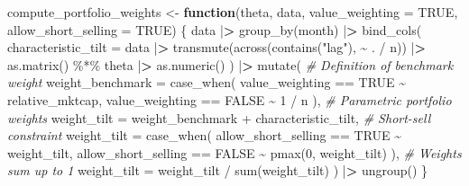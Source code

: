 \documentclass[
]{book}
\newenvironment{Shaded}{\begin{snugshade}}{\end{snugshade}}
\newcommand{\AttributeTok}[1]{\textcolor[rgb]{0.61,0.61,0.61}{#1}}
\newcommand{\CommentTok}[1]{\textcolor[rgb]{0.37,0.37,0.37}{\textit{#1}}}
\newcommand{\ConstantTok}[1]{\textcolor[rgb]{0,0,0}{#1}}
\newcommand{\ControlFlowTok}[1]{\textcolor[rgb]{0.27,0.27,0.27}{\textbf{#1}}}
\newcommand{\DecValTok}[1]{\textcolor[rgb]{0.06,0.06,0.06}{#1}}
\newcommand{\ErrorTok}[1]{\textcolor[rgb]{0.14,0.14,0.14}{\textbf{#1}}}
\newcommand{\FunctionTok}[1]{\textcolor[rgb]{0,0,0}{#1}}
\newcommand{\NormalTok}[1]{#1}
\newcommand{\OtherTok}[1]{\textcolor[rgb]{0.37,0.37,0.37}{#1}}
\newcommand{\SpecialCharTok}[1]{\textcolor[rgb]{0,0,0}{#1}}
\newcommand{\StringTok}[1]{\textcolor[rgb]{0.5,0.5,0.5}{#1}}
\begin{document}
\begin{Shaded}
\begin{Highlighting}[]
\NormalTok{compute\_portfolio\_weights }\OtherTok{\textless{}{-}} \ControlFlowTok{function}\NormalTok{(theta,}
\NormalTok{                                      data,}
                                      \AttributeTok{value\_weighting =} \ConstantTok{TRUE}\NormalTok{,}
                                      \AttributeTok{allow\_short\_selling =} \ConstantTok{TRUE}\NormalTok{) \{}
\NormalTok{  data }\SpecialCharTok{|}\ErrorTok{\textgreater{}}
    \FunctionTok{group\_by}\NormalTok{(month) }\SpecialCharTok{|}\ErrorTok{\textgreater{}}
    \FunctionTok{bind\_cols}\NormalTok{(}
      \AttributeTok{characteristic\_tilt =}\NormalTok{ data }\SpecialCharTok{|}\ErrorTok{\textgreater{}}
        \FunctionTok{transmute}\NormalTok{(}\FunctionTok{across}\NormalTok{(}\FunctionTok{contains}\NormalTok{(}\StringTok{"lag"}\NormalTok{), }\SpecialCharTok{\textasciitilde{}}\NormalTok{ . }\SpecialCharTok{/}\NormalTok{ n)) }\SpecialCharTok{|}\ErrorTok{\textgreater{}}
        \FunctionTok{as.matrix}\NormalTok{() }\SpecialCharTok{\%*\%}\NormalTok{ theta }\SpecialCharTok{|}\ErrorTok{\textgreater{}} \FunctionTok{as.numeric}\NormalTok{()}
\NormalTok{    ) }\SpecialCharTok{|}\ErrorTok{\textgreater{}}
    \FunctionTok{mutate}\NormalTok{(}
      \CommentTok{\# Definition of benchmark weight}
      \AttributeTok{weight\_benchmark =} \FunctionTok{case\_when}\NormalTok{(}
\NormalTok{        value\_weighting }\SpecialCharTok{==} \ConstantTok{TRUE} \SpecialCharTok{\textasciitilde{}}\NormalTok{ relative\_mktcap,}
\NormalTok{        value\_weighting }\SpecialCharTok{==} \ConstantTok{FALSE} \SpecialCharTok{\textasciitilde{}} \DecValTok{1} \SpecialCharTok{/}\NormalTok{ n}
\NormalTok{      ),}
      \CommentTok{\# Parametric portfolio weights}
      \AttributeTok{weight\_tilt =}\NormalTok{ weight\_benchmark }\SpecialCharTok{+}\NormalTok{ characteristic\_tilt,}
      \CommentTok{\# Short{-}sell constraint}
      \AttributeTok{weight\_tilt =} \FunctionTok{case\_when}\NormalTok{(}
\NormalTok{        allow\_short\_selling }\SpecialCharTok{==} \ConstantTok{TRUE} \SpecialCharTok{\textasciitilde{}}\NormalTok{ weight\_tilt,}
\NormalTok{        allow\_short\_selling }\SpecialCharTok{==} \ConstantTok{FALSE} \SpecialCharTok{\textasciitilde{}} \FunctionTok{pmax}\NormalTok{(}\DecValTok{0}\NormalTok{, weight\_tilt)}
\NormalTok{      ),}
      \CommentTok{\# Weights sum up to 1}
      \AttributeTok{weight\_tilt =}\NormalTok{ weight\_tilt }\SpecialCharTok{/} \FunctionTok{sum}\NormalTok{(weight\_tilt)}
\NormalTok{    ) }\SpecialCharTok{|}\ErrorTok{\textgreater{}}
    \FunctionTok{ungroup}\NormalTok{()}
\NormalTok{\}}
\end{Highlighting}
\end{Shaded}
\end{document}
